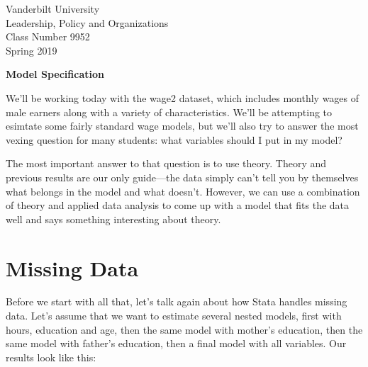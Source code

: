\documentclass[12pt]{article}
\begin{document}
\thispagestyle{empty}%


\setlength{\parskip}{1ex plus 0.5ex minus 0.2ex}

\setcounter{secnumdepth}{-2}



\begin{flushleft}
Vanderbilt University\\Leadership, Policy and Organizations\\Class Number 9952\\ Spring 2019
\end{flushleft}

\begin{center}
\textbf{Model Specification}
\end{center}

We'll be working today with the wage2 dataset, which includes monthly
wages of male earners along with a variety of characteristics. We'll
be attempting to esimtate some fairly standard wage models, but we'll
also try to answer the most vexing question for many students: what
variables should I put in my model?

The most important answer to that question is to use theory. Theory
and previous results are our only guide---the data simply can't tell
you by themselves what belongs in the model and what doesn't. However,
we can  use a combination of theory and applied data analysis to come
up with a model that fits the data well and says something interesting
about theory. 

\section{Missing Data}
\label{sec:missing-data}

Before we start with all that, let's talk again about how Stata
handles missing data. Let's assume that we want to estimate several
nested models, first with hours, education and age, then the same
model with mother's education, then the same model with father's
education, then a final model with all variables. Our results look
like this: 
\end{document}
